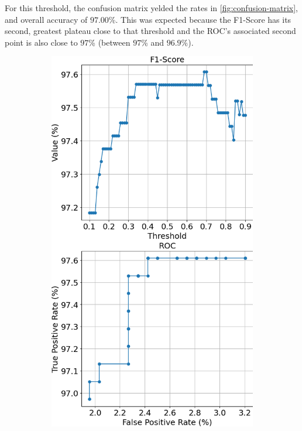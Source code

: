 For this threshold, the confusion matrix yelded the rates in \cref{fig:confusion-matrix}, 
and overall accuracy of $97.00$\%. 
This was expected because the F1-Score has its second, greatest plateau close to that threshold
and the ROC's associated second point is also close to $97$\% (between $97$\% and $96.9\%$).

\begin{figure}[htbp]
    \centering 
    \caption{
        F1-Score and ROC for (a) training and (b) testing. 
        All rates refer to ``male'' class.
    }
\hfill
    \begin{subfigure}[t]{.33\textwidth}
        \caption{}
        \label{fig:results-training}
        \includegraphics[width=\linewidth]{../../python_code/plots/logistic_regression/results-train.png}

\end{subfigure}
\end{figure}
